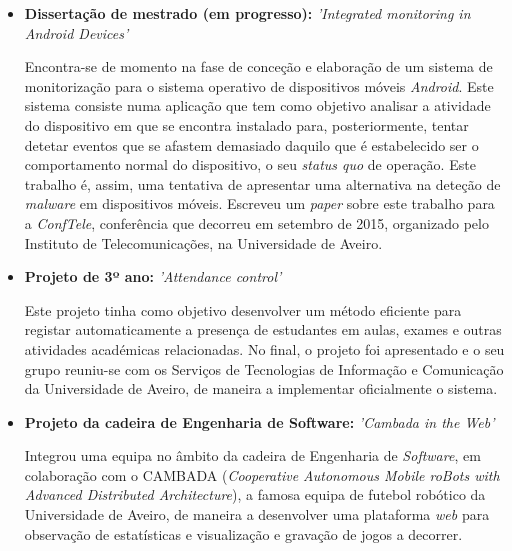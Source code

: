 \documentclass[11pt,a4paper,sans]{moderncv} %
\begin{document}
\begin{itemize}

\item{\textbf{Dissertação de mestrado (em progresso): } \textit{'Integrated
      monitoring in Android Devices'}

\vspace{3pt}

\small{Encontra-se de momento na fase de conceção e elaboração de um sistema de
  monitorização para o sistema operativo de dispositivos móveis
  \textit{Android}. Este sistema consiste numa aplicação que tem como objetivo
  analisar a atividade do dispositivo em que se encontra instalado para,
  posteriormente, tentar detetar eventos que se afastem demasiado daquilo que é
  estabelecido ser o comportamento normal do dispositivo, o seu \textit{status
    quo} de operação. Este trabalho é, assim, uma tentativa de apresentar uma
  alternativa na deteção de \textit{malware} em dispositivos móveis. Escreveu um
  \textit{paper} sobre este trabalho para a \textit{ConfTele}, conferência que
  decorreu em setembro de 2015, organizado pelo Instituto de Telecomunicações,
  na Universidade de Aveiro.}}

\item{\textbf{Projeto de 3º ano: } \textit{'Attendance control'}

\vspace{3pt}

\small{Este projeto tinha como objetivo desenvolver um método eficiente para
  registar automaticamente a presença de estudantes em aulas, exames e outras
  atividades académicas relacionadas. No final, o projeto foi apresentado e o
  seu grupo reuniu-se com os Serviços de Tecnologias de Informação e Comunicação
  da Universidade de Aveiro, de maneira a implementar oficialmente o sistema.}}

\vspace{6pt}

\item{\textbf{Projeto da cadeira de Engenharia de Software: }\textit{'Cambada
      in the Web'}

\vspace{3pt}

\small{Integrou uma equipa no âmbito da cadeira de Engenharia de
  \textit{Software}, em colaboração com o CAMBADA (\textit{Cooperative
    Autonomous Mobile roBots with Advanced Distributed Architecture}), a famosa
  equipa de futebol robótico da Universidade de Aveiro, de maneira a desenvolver
  uma plataforma \textit{web} para observação de estatísticas e visualização e
  gravação de jogos a decorrer.}}


\end{itemize}
\end{document}
